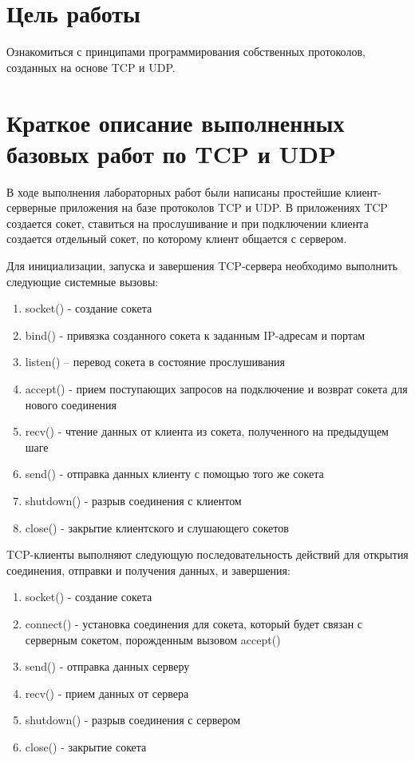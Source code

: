 




%


\section{Цель работы}
Ознакомиться с принципами программирования собственных протоколов, созданных на основе TCP и UDP.

\section{Краткое описание выполненных базовых работ по TCP и UDP}


В ходе выполнения лабораторных работ были написаны простейшие клиент-серверные приложения на базе протоколов TCP и UDP.
В приложениях TCP создается сокет, ставиться на прослушивание и при подключении клиента создается отдельный сокет, по которому клиент общается с сервером. 

Для инициализации, запуска и завершения TCP-сервера необходимо выполнить следующие системные вызовы:

\begin{enumerate}
\item socket() - создание сокета
\item bind() - привязка созданного сокета к заданным IP-адресам и портам
\item listen() – перевод сокета в состояние прослушивания
\item accept() - прием поступающих запросов на подключение и возврат сокета для нового соединения
\item recv() - чтение данных от клиента из сокета, полученного на предыдущем шаге
\item send() - отправка данных клиенту с помощью того же сокета
\item shutdown() - разрыв соединения с клиентом
\item close() - закрытие клиентского и слушающего сокетов
\end{enumerate}

TCP-клиенты выполняют следующую последовательность действий для открытия соединения, отправки и получения данных, и завершения:

\begin{enumerate}
\item socket() - создание сокета
\item connect() - установка соединения для сокета, который будет связан с серверным сокетом, порожденным вызовом accept()
\item send() - отправка данных серверу
\item recv() - прием данных от сервера
\item shutdown() - разрыв соединения с сервером
\item close() - закрытие сокета
\end{enumerate}

